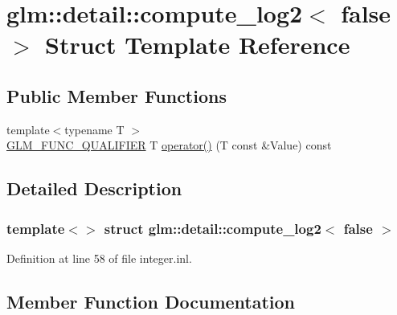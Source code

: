 \hypertarget{structglm_1_1detail_1_1compute__log2_3_01false_01_4}{}\section{glm\+:\+:detail\+:\+:compute\+\_\+log2$<$ false $>$ Struct Template Reference}
\label{structglm_1_1detail_1_1compute__log2_3_01false_01_4}
\subsection*{Public Member Functions}
\begin{DoxyCompactItemize}
\item 
{\footnotesize template$<$typename T $>$ }\\\hyperlink{setup_8hpp_a33fdea6f91c5f834105f7415e2a64407}{G\+L\+M\+\_\+\+F\+U\+N\+C\+\_\+\+Q\+U\+A\+L\+I\+F\+I\+ER} T \hyperlink{structglm_1_1detail_1_1compute__log2_3_01false_01_4_aea472475acf9d843d47144366823a288}{operator()} (T const \&Value) const
\end{DoxyCompactItemize}


\subsection{Detailed Description}
\subsubsection*{template$<$$>$\newline
struct glm\+::detail\+::compute\+\_\+log2$<$ false $>$}



Definition at line 58 of file integer.\+inl.



\subsection{Member Function Documentation}
\mbox{\label{structglm_1_1detail_1_1compute__log2_3_01false_01_4_aea472475acf9d843d47144366823a288}} 

